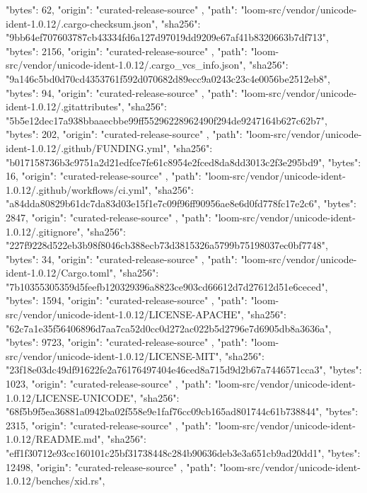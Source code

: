 {{      "bytes": 62,
      "origin": "curated-release-source"
    },
    {
      "path": "loom-src/vendor/unicode-ident-1.0.12/.cargo-checksum.json",
      "sha256": "9bb64ef707603787cb43334fd6a127d97019dd9209e67af41b8320663b7df713",
      "bytes": 2156,
      "origin": "curated-release-source"
    },
    {
      "path": "loom-src/vendor/unicode-ident-1.0.12/.cargo_vcs_info.json",
      "sha256": "9a146c5bd0d70cd4353761f592d070682d89ecc9a0243c23c4e0056be2512eb8",
      "bytes": 94,
      "origin": "curated-release-source"
    },
    {
      "path": "loom-src/vendor/unicode-ident-1.0.12/.gitattributes",
      "sha256": "5b5e12dec17a938bbaaecbbe99ff55296228962490f294de9247164b627c62b7",
      "bytes": 202,
      "origin": "curated-release-source"
    },
    {
      "path": "loom-src/vendor/unicode-ident-1.0.12/.github/FUNDING.yml",
      "sha256": "b017158736b3c9751a2d21edfce7fe61c8954e2fced8da8dd3013c2f3e295bd9",
      "bytes": 16,
      "origin": "curated-release-source"
    },
    {
      "path": "loom-src/vendor/unicode-ident-1.0.12/.github/workflows/ci.yml",
      "sha256": "a84dda80829b61dc7da83d03e15f1e7c09f96ff90956ae8e6d0fd778fc17e2c6",
      "bytes": 2847,
      "origin": "curated-release-source"
    },
    {
      "path": "loom-src/vendor/unicode-ident-1.0.12/.gitignore",
      "sha256": "227f9228d522eb3b98f8046cb388ecb73d3815326a5799b75198037ec0bf7748",
      "bytes": 34,
      "origin": "curated-release-source"
    },
    {
      "path": "loom-src/vendor/unicode-ident-1.0.12/Cargo.toml",
      "sha256": "7b10355305359d5feefb120329396a8823ce903cd66612d7d27612d51e6ceced",
      "bytes": 1594,
      "origin": "curated-release-source"
    },
    {
      "path": "loom-src/vendor/unicode-ident-1.0.12/LICENSE-APACHE",
      "sha256": "62c7a1e35f56406896d7aa7ca52d0cc0d272ac022b5d2796e7d6905db8a3636a",
      "bytes": 9723,
      "origin": "curated-release-source"
    },
    {
      "path": "loom-src/vendor/unicode-ident-1.0.12/LICENSE-MIT",
      "sha256": "23f18e03dc49df91622fe2a76176497404e46ced8a715d9d2b67a7446571cca3",
      "bytes": 1023,
      "origin": "curated-release-source"
    },
    {
      "path": "loom-src/vendor/unicode-ident-1.0.12/LICENSE-UNICODE",
      "sha256": "68f5b9f5ea36881a0942ba02f558e9e1faf76cc09cb165ad801744c61b738844",
      "bytes": 2315,
      "origin": "curated-release-source"
    },
    {
      "path": "loom-src/vendor/unicode-ident-1.0.12/README.md",
      "sha256": "eff1f30712e93cc160101c25bf31738448c284b90636deb3e3a651cb9ad20dd1",
      "bytes": 12498,
      "origin": "curated-release-source"
    },
    {
      "path": "loom-src/vendor/unicode-ident-1.0.12/benches/xid.rs",
}}
